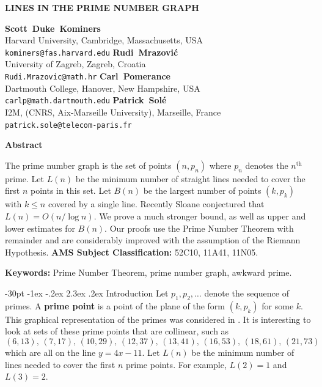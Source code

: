 \documentclass[10pt]{article}
\makeatletter
\renewcommand\section{\@startsection {section}{1}{\z@}
{-30pt \@plus -1ex \@minus -.2ex}
{2.3ex \@plus.2ex}
{\normalfont\normalsize\bfseries\boldmath}}
\theoremstyle{definition}
\theoremstyle{remark}
\numberwithin{equation}{section}
\makeatother
\begin{document}
\begin{center}
\uppercase{\bf \boldmath Lines in the prime number graph}
\vskip 20pt

{\bf Scott~Duke~Kominers}\\
{\smallit Harvard University, Cambridge, Massachusetts, USA}\\
{\tt kominers@fas.harvard.edu}
\vskip10pt
{\bf Rudi~Mrazovi\'c}\\
{\smallit University of Zagreb, Zagreb, Croatia}\\
{\tt Rudi.Mrazovic@math.hr}
\vskip10pt
{\bf Carl~Pomerance}\\
{\smallit Dartmouth College, Hanover, New Hampshire, USA}\\
{\tt carlp@math.dartmouth.edu}
\vskip 10pt
{\bf Patrick~Sol\'e}\\
{\smallit I2M, (CNRS, Aix-Marseille University), Marseille, France}\\
{\tt patrick.sole@telecom-paris.fr}
\end{center}
\vskip 20pt

\centerline{\bf Abstract}
The prime number graph is the set of points $(n,p_n)$ where $p_n$ denotes the $n^{\text{th}}$ prime. Let $L(n)$ be the minimum number of straight lines needed to cover the first $n$ points in this set.
Let $B(n)$ be the largest number of points $(k,p_k)$ with $k\le n$ covered by a single line. 
Recently Sloane conjectured that $L(n) = O(n/\log n)$.  We prove a much stronger bound,
as well as upper and lower estimates for $B(n)$.  Our proofs use the Prime Number Theorem with remainder
and are considerably improved with the assumption of the Riemann Hypothesis.
\noindent
\vskip 20pt
{\small {\bf AMS Subject Classification:} 52C10, 11A41, 11N05.}

{\small {\bf Keywords:} Prime Number Theorem, prime number graph, awkward prime.}

 
\pagestyle{myheadings}
\thispagestyle{empty}
\baselineskip=12.875pt
\vskip 30pt
\section{Introduction}
Let $p_1,p_2,\dots$ denote the sequence of primes.
A {\bf prime point} is a point of the plane of the form $(k,p_k)$ for some $k.$ This  graphical representation of the primes was considered
in \cite{P}.  It is interesting to look at sets of these prime points that are collinear, such as
\[
(6, 13),\, (7, 17), \,(10, 29),\, (12, 37),\, (13, 41), \,(16, 53), \,(18, 61), \,(21,73)
\]
which are all on the line $y=4x-11$.
Let $L(n)$ be the minimum number of lines needed to cover the first $n$ prime points. 
For example, $L(2)=1$ and $L(3)=2.$
\end{document}
